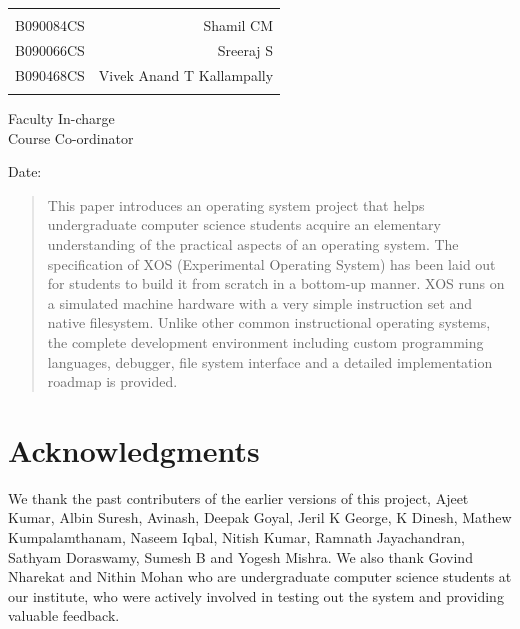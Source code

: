 \documentclass[10pt]{report}
\begin{document}
\begin{table}[h]
\centering
\begin{tabular}{lr}
\hline
\\
B090084CS & Shamil CM \\ 
B090066CS & Sreeraj S \\
B090468CS & Vivek Anand T Kallampally \\
\\
\hline
\end{tabular}
\end{table}

\vfill


\begin{flushright}
Faculty In-charge\\[1.5cm]
Course Co-ordinator\\[1.0cm]
\end{flushright}

\begin{flushleft}
Date:
\end{flushleft}



\begin{abstract}
This paper introduces an operating system project that helps undergraduate computer science students acquire an elementary understanding of the practical aspects of an operating system. The specification of XOS (Experimental Operating System) has been laid out for students to build it from scratch in a bottom-up manner. XOS runs on a simulated machine hardware with a very simple  instruction set  and native filesystem. Unlike other common instructional operating systems, the complete development environment including custom programming languages, debugger, file system interface and a detailed implementation roadmap is provided. 

\end{abstract}


\tableofcontents

\newpage
{}


\clearpage
{}
\chapter*{Acknowledgments}
\vspace{1.0in}
We thank the past contributers of the earlier versions of this project, Ajeet Kumar, Albin Suresh, Avinash, Deepak Goyal, Jeril K George, K Dinesh, Mathew Kumpalamthanam, Naseem Iqbal, Nitish Kumar, Ramnath Jayachandran, Sathyam Doraswamy, Sumesh B and Yogesh Mishra. We also thank Govind Nharekat and Nithin Mohan who are undergraduate computer science students at our institute, who were actively involved in testing out the system and providing valuable feedback. 
\\
\end{document}
